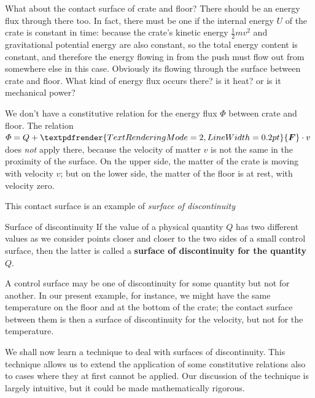 \documentclass[a4paper,12pt,%
onecolumn,oneside,%
british%
]{memoir}
\renewcommand*{\bm}[1]{\textpdfrender{TextRenderingMode=2,LineWidth=0.2pt}{\boldsymbol{#1}}}
\renewcommand*{\|}[1][]{\nonscript\:#1\vert\nonscript\:\mathopen{}}
\newcommand*{\ym}{m}%
\newcommand*{\yU}{U}
\newcommand*{\yH}{\varPhi}%
\newcommand*{\yQ}{Q}%
\newcommand*{\yF}{\bm{F}}
\begin{document}
What about the contact surface of crate and floor? There should be an energy flux through there too. In fact, there must be one if the internal energy $\yU$ of the crate is constant in time: because the crate's kinetic energy $\tfrac12\ym v^{2}$ and gravitational potential energy are also constant, so the total energy content is constant, and therefore the energy flowing in from the push must flow out from somewhere else in this case. Obviously its flowing through the surface between crate and floor. What kind of energy flux occurs there? is it heat? or is it mechanical power?

We don't have a constitutive relation for the energy flux $\yH$ between crate and floor. The relation $\yH = \yQ + \yF\cdot v$ does \emph{not} apply there, because the velocity of matter $v$ is not the same in the proximity of the surface. On the upper side, the matter of the crate is moving with velocity $v$; but on the lower side, the matter of the floor is at rest, with velocity zero.

This contact surface is an example of \emph{surface of discontinuity}
\begin{definition}{Surface of discontinuity}
If the value of a physical quantity $Q$ has two different values as we consider points closer and closer to the two sides of a small control surface, then the latter is called a \textbf{surface of discontinuity for the quantity $Q$}.
\end{definition}
A control surface may be one of discontinuity for some quantity but not for another. In our present example, for instance, we might have the same temperature on the floor and at the bottom of the crate; the contact surface between them is then a surface of discontinuity for the velocity, but not for the temperature.

\medskip

We shall now learn a technique to deal with surfaces of discontinuity. This technique allows us to extend the application of some constitutive relations also to cases where they at first cannot be applied. Our discussion of the technique is largely intuitive, but it could be made mathematically rigorous.
\end{document}
